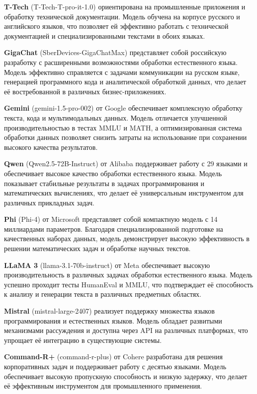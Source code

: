\textbf{T-Tech} (T-Tech-T-pro-it-1.0) ориентирована на промышленные приложения и обработку технической документации. Модель обучена на корпусе русского и английского языков, что позволяет ей эффективно работать с технической документацией и специализированными текстами в обоих языках. \cite{ttech}

\textbf{GigaChat} (SberDevices-GigaChatMax) представляет собой российскую разработку с расширенными возможностями обработки естественного языка. Модель эффективно справляется с задачами коммуникации на русском языке, генерацией программного кода и аналитической обработкой данных, что делает её востребованной в различных бизнес-приложениях. \cite{gigachat}

\textbf{Gemini} (gemini-1.5-pro-002) от Google обеспечивает комплексную обработку текста, кода и мультимодальных данных. Модель отличается улучшенной производительностью в тестах MMLU и MATH, а оптимизированная система обработки данных позволяет снизить затраты на использование при сохранении высокого качества результатов. \cite{gemini}

\textbf{Qwen} (Qwen2.5-72B-Instruct) от Alibaba поддерживает работу с 29 языками и обеспечивает высокое качество обработки естественного языка. Модель показывает стабильные результаты в задачах программирования и математических вычислениях, что делает её универсальным инструментом для различных прикладных задач. \cite{qwen}

\textbf{Phi} (Phi-4) от Microsoft представляет собой компактную модель с 14 миллиардами параметров. Благодаря специализированной подготовке на качественных наборах данных, модель демонстрирует высокую эффективность в решении математических задач и обработке научных текстов. \cite{phi}

\textbf{LLaMA 3} (llama-3.1-70b-instruct) от Meta обеспечивает высокую производительность в различных задачах обработки естественного языка. Модель успешно проходит тесты HumanEval и MMLU, что подтверждает её способность к анализу и генерации текста в различных предметных областях. \cite{llama}

\textbf{Mistral} (mistral-large-2407) реализует поддержку множества языков программирования и естественных языков. Модель обладает развитыми механизмами рассуждения и доступна через API на различных платформах, что упрощает её интеграцию в существующие системы. \cite{mistral}

\textbf{Command-R+} (command-r-plus) от Cohere разработана для решения корпоративных задач и поддерживает работу с десятью языками. Модель обеспечивает высокую пропускную способность и низкую задержку, что делает её эффективным инструментом для промышленного применения. \cite{cohere}


